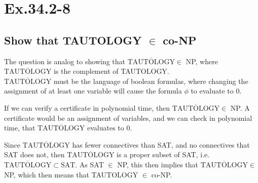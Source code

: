 \section*{Ex.34.2-8}
\subsection*{Show that TAUTOLOGY $\in$ co-NP}

The question is analog to showing that $\overline{\text{TAUTOLOGY}}\in$ NP, where $\overline{\text{TAUTOLOGY}}$ is the complement of TAUTOLOGY.
\\
$\overline{\text{TAUTOLOGY}}$ must be the language of boolean formulas, where changing the assignment of at least one variable will cause the formula $\phi$ to evaluate to 0.

If we can verify a certificate in polynomial time, then $\overline{\text{TAUTOLOGY}}\in$ NP. A certificate would be an assignment of variables, and we can check in polynomial time, that $\overline{\text{TAUTOLOGY}}$ evaluates to 0.

Since $\overline{\text{TAUTOLOGY}}$ has fewer connectives than SAT, and no connectives that SAT does not, then $\overline{\text{TAUTOLOGY}}$ is a proper subset of SAT, i.e. $\overline{\text{TAUTOLOGY}} \subset \text{SAT}$. As SAT $\in$ NP, this then implies that $\overline{\text{TAUTOLOGY}} \in$ NP, which then means that TAUTOLOGY $\in$ co-NP.